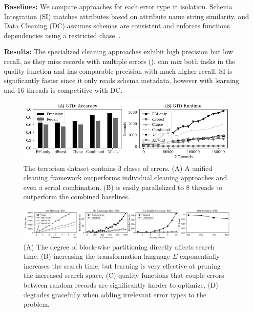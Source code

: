 \vspace{0.5em}\noindent\textbf{Baselines: } We compare approaches for each error type in isolation.  Schema Integration  (SI) matches attributes based on attribute name string similarity, and Data Cleaning (DC) assumes schemas are consistent and enforces functions dependencies using a restricted chase~\cite{benedikt2017benchmarking}.

\vspace{0.5em}\noindent\textbf{Results: } The specialized cleaning approaches exhibit high precision but low recall, as they miss records with multiple errors ().  \sys can mix both tasks in the quality function and has comparable precision with much higher recall.  SI is significantly faster since it only reads schema metadata, however \sys with learning and 16 threads is competitive with DC.

\begin{figure}[ht]
    \centering
    \includegraphics[width=\columnwidth]{ac-experiments/exp7.png}
    \caption{\small The terrorism dataset contains 3 classe of errors. (A) A unified cleaning framework outperforms individual cleaning approaches and even a serial combination.  (B) \sys is easily parallelized to 8 threads to outperform the combined baselines.  \label{exp7a}}
\end{figure}

\begin{figure}[ht]
\centering
 \includegraphics[width=\textwidth]{ac-experiments/exp4.png}
 \caption{\small (A) The degree of block-wise partitioning directly affects search time, (B) increasing the transformation language $\Sigma$ exponentially increases the search time, but learning is very effective at pruning the increased search space, (C) quality functions that couple errors between random records are significantly harder to optimize, (D) \sys degrades gracefully when adding irrelevant error types to the problem.  
 \label{fig:microbenchmarks}}
\end{figure}

